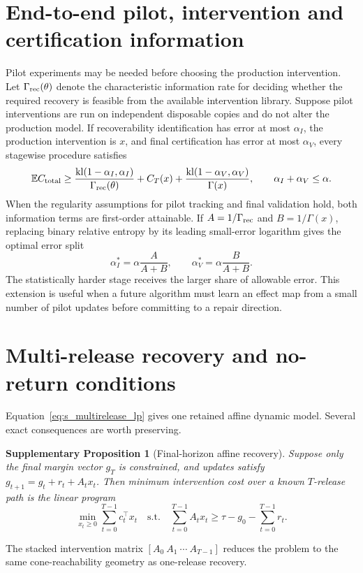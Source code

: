\documentclass[11pt,letterpaper]{article}
\theoremstyle{plain}
\newtheorem{proposition}{Supplementary Proposition}
\newcommand{\1}{\mathbf 1}
\begin{document}
\section{End-to-end pilot, intervention and certification information}
Pilot experiments may be needed before choosing the production intervention. Let $\Gamma_{\rm rec}(\theta)$ denote the characteristic information rate for deciding whether the required recovery is feasible from the available intervention library. Suppose pilot interventions are run on independent disposable copies and do not alter the production model. If recoverability identification has error at most $\alpha_I$, the production intervention is $x$, and final certification has error at most $\alpha_V$, every stagewise procedure satisfies
\begin{equation}
 \mathbb E C_{\rm total}\ge
 \frac{\operatorname{kl}(1-\alpha_I,\alpha_I)}{\Gamma_{\rm rec}(\theta)}
 +C_T(x)
 +\frac{\operatorname{kl}(1-\alpha_V,\alpha_V)}{\Gamma(x)},
 \qquad \alpha_I+\alpha_V\le\alpha.
\label{eq:s_end_to_end_info}
\end{equation}
When the regularity assumptions for pilot tracking and final validation hold, both information terms are first-order attainable. If $A=1/\Gamma_{\rm rec}$ and $B=1/\Gamma(x)$, replacing binary relative entropy by its leading small-error logarithm gives the optimal error split
\begin{equation}
 \alpha_I^*=\alpha\frac{A}{A+B},\qquad
 \alpha_V^*=\alpha\frac{B}{A+B}.
\label{eq:s_error_split}
\end{equation}
The statistically harder stage receives the larger share of allowable error. This extension is useful when a future algorithm must learn an effect map from a small number of pilot updates before committing to a repair direction.

\section{Multi-release recovery and no-return conditions}
Equation~\ref{eq:s_multirelease_lp} gives one retained affine dynamic model. Several exact consequences are worth preserving.

\begin{proposition}[Final-horizon affine recovery]
Suppose only the final margin vector $g_T$ is constrained, and updates satisfy $g_{t+1}=g_t+r_t+A_tx_t$. Then minimum intervention cost over a known $T$-release path is the linear program
\begin{equation}
 \min_{x_t\ge0}\sum_{t=0}^{T-1}c_t^\top x_t
 \quad\text{s.t.}\quad
 \sum_{t=0}^{T-1}A_tx_t\ge \tau-g_0-\sum_{t=0}^{T-1}r_t.
\label{eq:s_final_horizon_lp}
\end{equation}
\end{proposition}
The stacked intervention matrix $[A_0\ A_1\ \cdots\ A_{T-1}]$ reduces the problem to the same cone-reachability geometry as one-release recovery.
\end{document}
